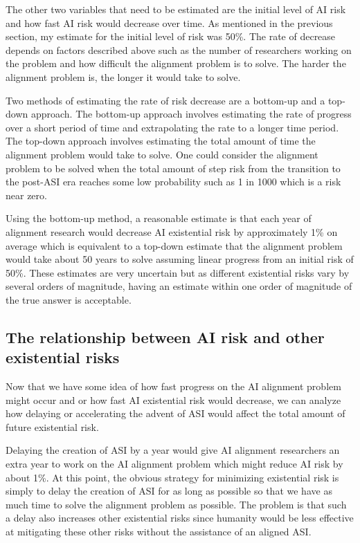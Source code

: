 \documentclass{article}
\begin{document}
The other two variables that need to be estimated are the initial level of AI risk and how fast AI risk would decrease over time. As mentioned in the previous section, my estimate for the initial level of risk was 50\%. The rate of decrease depends on factors described above such as the number of researchers working on the problem and how difficult the alignment problem is to solve. The harder the alignment problem is, the longer it would take to solve.

Two methods of estimating the rate of risk decrease are a bottom-up and a top-down approach. The bottom-up approach involves estimating the rate of progress over a short period of time and extrapolating the rate to a longer time period. The top-down approach involves estimating the total amount of time the alignment problem would take to solve. One could consider the alignment problem to be solved when the total amount of step risk from the transition to the post-ASI era reaches some low probability such as 1 in 1000 which is a risk near zero.

Using the bottom-up method, a reasonable estimate is that each year of alignment research would decrease AI existential risk by approximately 1\% on average which is equivalent to a top-down estimate that the alignment problem would take about 50 years to solve assuming linear progress from an initial risk of 50\%. These estimates are very uncertain but as different existential risks vary by several orders of magnitude, having an estimate within one order of magnitude of the true answer is acceptable.

\subsection{The relationship between AI risk and other existential risks}

Now that we have some idea of how fast progress on the AI alignment problem might occur and or how fast AI existential risk would decrease, we can analyze how delaying or accelerating the advent of ASI would affect the total amount of future existential risk.

Delaying the creation of ASI by a year would give AI alignment researchers an extra year to work on the AI alignment problem which might reduce AI risk by about 1\%. At this point, the obvious strategy for minimizing existential risk is simply to delay the creation of ASI for as long as possible so that we have as much time to solve the alignment problem as possible. The problem is that such a delay also increases other existential risks since humanity would be less effective at mitigating these other risks without the assistance of an aligned ASI.
\end{document}
